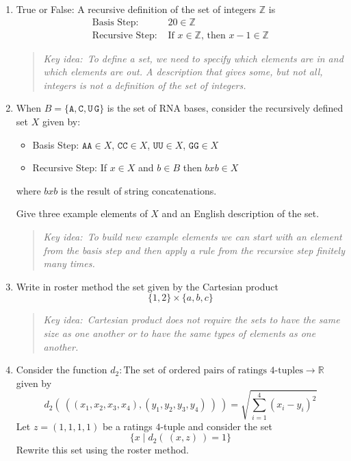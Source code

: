 \documentclass[12pt, oneside]{article}
\newcommand{\A}[0]{\texttt{A}}
\newcommand{\C}[0]{\texttt{C}}
\newcommand{\G}[0]{\texttt{G}}
\newcommand{\U}[0]{\texttt{U}}
\begin{document}
\begin{flushright}
\end{flushright} \newcommand{\KeyIdea}[1]{\begin{quote}{\it Key idea:~{#1}}\end{quote}}

\begin{enumerate}
    \item True or False: A recursive definition of the set of integers $\mathbb{Z}$ is 
    \[
        \begin{array}{ll}
        \textrm{Basis Step: } & 20 \in \mathbb{Z} \\
        \textrm{Recursive Step: } & \textrm{If } x \in \mathbb{Z} \textrm{, then } x-1 \in \mathbb{Z}
        \end{array}
    \]

        \KeyIdea{To define a set, we need to specify which elements are in and which elements are out.
        A description that gives some, but not all, integers is not a definition of the set of integers.}

    \item When $B = \{ \A, \C, \U\, \G\}$ is the set of RNA bases, 
    consider the recursively defined set $X$ given by:
    \begin{itemize}
    \item[] Basis Step: $\A\A \in X$, $\C\C \in X$, $\U\U \in X$, $\G\G \in X$
    \item[] Recursive Step: If $x \in X$ and $b \in B$ then $bxb \in X$
    \end{itemize}
    where $bxb$ is the result of string concatenations.

    Give three example elements of $X$ and an English description of the set.

        \KeyIdea{To build new example elements we can start with an element from 
        the basis step and then apply a rule from the recursive step finitely many times.}

    \item Write in roster method the set given by the Cartesian product
    \[ 
        \{1,2\} \times \{a,b,c\}
    \]

        \KeyIdea{Cartesian product does not require the sets to have the same size as one another
        or to have the same types of elements as one another.}

    \item Consider the function $d_2: \textrm{The set of ordered pairs of ratings $4$-tuples} \to \mathbb{R}$
    given by 
    \[ 
        d_2 (~( (x_1, x_2, x_3, x_4), (y_1, y_2, y_3, y_4)~)~) = \sqrt{\sum_{i=1}^4 (x_i - y_i)^2}
    \]
    Let $z = (1,1,1,1)$ be a ratings $4$-tuple and consider the set
    \[
        \{ x \mid d_2 ( ~(x,z)~) = 1 \}
    \]
    Rewrite this set using the roster method.


\end{enumerate}
\end{document}
